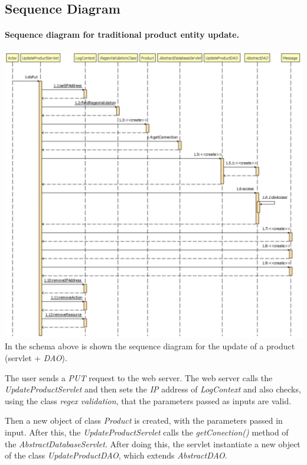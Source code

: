 \pagebreak
\subsection{Sequence Diagram}

\paragraph[]{Sequence diagram for traditional product entity update.} \hspace{1mm} \par
\includegraphics[width=\textwidth, keepaspectratio]{resources/updateproductsequence.pdf}
In the schema above is shown the sequence diagram for the update of a product (servlet + \textit{DAO}). 

The user sends a \textit{PUT} request to the web server. The web server calls the \textit{UpdateProductServlet} and then sets the \textit{IP} address of \textit{LogContext} and also checks, using the class \textit{regex validation}, that the parameters passed as inputs are valid.

Then a new object of class \textit{Product} is created, with the parameters passed in input. After this, the \textit{UpdateProductServlet} calls the \textit{getConection()} method of the \textit{AbstractDatabaseServlet}. After doing this, the servlet instantiate a new object of the class \textit{UpdateProductDAO}, which extends \textit{AbstractDAO}.

